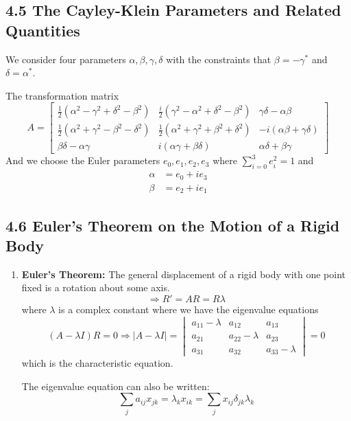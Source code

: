\documentclass{article}
\begin{document}
	\subsection*{4.5 The Cayley-Klein Parameters and Related Quantities}
	We consider four parameters $\alpha, \beta, \gamma, \delta$ with the constraints that $\beta = -\gamma^*$ and $\delta = \alpha^*$.
	
	The transformation matrix
	\[
	A = 
	\begin{bmatrix}
		\frac{1}{2}(\alpha^2 - \gamma^2 + \delta^2 - \beta^2) & \frac{i}{2}(\gamma^2 - \alpha^2 + \delta^2 - \beta^2) & \gamma\delta - \alpha\beta \\
		\frac{1}{2}(\alpha^2 + \gamma^2 - \beta^2 - \delta^2) & \frac{1}{2}(\alpha^2 + \gamma^2 + \beta^2 + \delta^2) & -i(\alpha\beta + \gamma\delta) \\
		\beta\delta - \alpha\gamma & i(\alpha\gamma + \beta\delta) & \alpha\delta + \beta\gamma
	\end{bmatrix}
	\]
	And we choose the Euler parameters $e_0, e_1, e_2, e_3$ where $\sum_{i=0}^{3} e_i^2 = 1$ and
	\begin{align*}
		\alpha &= e_0 + ie_3 \\
		\beta &= e_2 + ie_1
	\end{align*}
	
	\subsection*{4.6 Euler's Theorem on the Motion of a Rigid Body}
	\begin{enumerate}
		\item \textbf{Euler's Theorem:} The general displacement of a rigid body with one point fixed is a rotation about some axis.
		\[
		\Rightarrow R' = AR = R \lambda
		\]
		where $\lambda$ is a complex constant where we have the eigenvalue equations
		\[
		(A-\lambda I)R=0 \Rightarrow |A-\lambda I| = 
		\begin{vmatrix}
			a_{11}-\lambda & a_{12} & a_{13} \\
			a_{21} & a_{22}-\lambda & a_{23} \\
			a_{31} & a_{32} & a_{33}-\lambda
		\end{vmatrix} = 0
		\]
		which is the characteristic equation.
		
		The eigenvalue equation can also be written:
		\[
		\sum_j a_{ij}x_{jk} = \lambda_k x_{ik} = \sum_j x_{ij} \delta_{jk} \lambda_k
		\]
	\end{enumerate}
\end{document}
